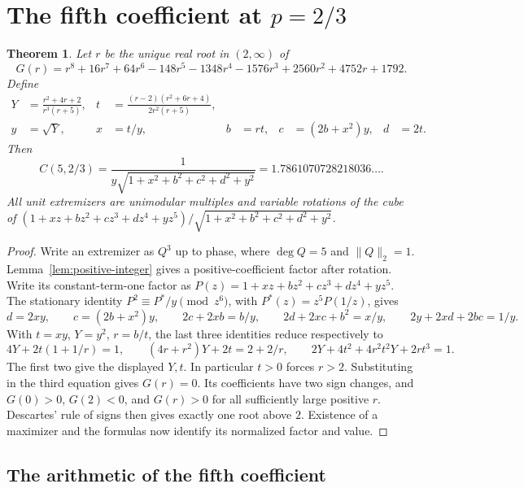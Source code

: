 \documentclass[11pt]{article}
\newtheorem{theorem}{Theorem}
\begin{document}
\section{The fifth coefficient at \texorpdfstring{\(p=2/3\)}{p=2/3}}

\begin{theorem}

Let \(r\) be the unique real root in \((2,\infty)\) of
\[
 G(r)=r^8+16r^7+64r^6-148r^5-1348r^4-1576r^3
              +2560r^2+4752r+1792.
\]
Define
\begin{align*}
 Y&=\frac{r^2+4r+2}{r^3(r+5)},&
 t&=\frac{(r-2)(r^2+6r+4)}{2r^2(r+5)},\\
 y&=\sqrt Y,&
 x&=t/y,&
 b&=rt,&
 c&=(2b+x^2)y,&
 d&=2t .
\end{align*}
Then
\[
 C(5,2/3)=\frac{1}{y\sqrt{1+x^2+b^2+c^2+d^2+y^2}}
           =1.7861070728218036\ldots .
\]
All unit extremizers are unimodular multiples and variable rotations
of the cube of
\((1+xz+bz^2+cz^3+dz^4+yz^5)/\sqrt{1+x^2+b^2+c^2+d^2+y^2}\).

\end{theorem}

\begin{proof}
Write an extremizer as \(Q^3\) up to phase,
where \(\deg Q=5\) and \(\|Q\|_2=1\). Lemma~\ref{lem:positive-integer} gives a positive-coefficient factor
after rotation. Write its constant-term-one factor as
\(P(z)=1+xz+bz^2+cz^3+dz^4+yz^5\). The stationary identity
\(P^2\equiv P^*/y\pmod{z^6}\), with \(P^*(z)=z^5 P(1/z)\),
gives
\[
 d=2xy,\qquad c=(2b+x^2)y,\qquad
 2c+2xb=b/y,\qquad
 2d+2xc+b^2=x/y,\qquad
 2y+2xd+2bc=1/y.
\]
With \(t=xy\), \(Y=y^2\), \(r=b/t\), the last
three identities reduce respectively to
\[
 4Y+2t(1+1/r)=1,\qquad
 (4r+r^2)Y+2t=2+2/r,\qquad
 2Y+4t^2+4r^2t^2Y+2rt^3=1.
\]
The first two give the displayed \(Y,t\).
In particular \(t>0\) forces \(r>2\). Substituting in the third
equation gives \(G(r)=0\). Its coefficients have two sign
changes, and \(G(0)>0\), \(G(2)<0\), and \(G(r)>0\) for all
sufficiently large positive \(r\). Descartes' rule of signs
then gives exactly one root above \(2\). Existence of a maximizer
and the formulas now identify its normalized factor and value.

\end{proof}



\subsection{The arithmetic of the fifth coefficient}
\end{document}
